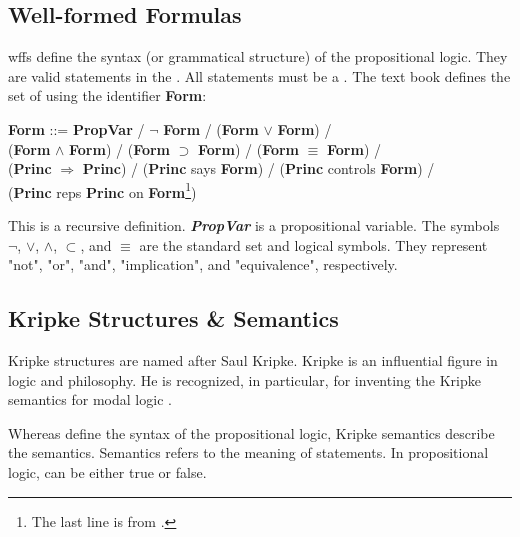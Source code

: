 \documentclass[../../main/main.tex]{subfiles}
\begin{document}
\subsection{Well-formed Formulas}\label{ssec:wff}
\Glspl{wff} define the syntax (or grammatical structure) of the propositional logic.  They are valid statements in the .  All  statements must be a .  The text book defines the set of  using the identifier \textbf{Form}:

\begin{center}\label{wffdef}
\textbf{Form} ::= \textbf{PropVar} / $\neg$ \textbf{Form} / (\textbf{Form} $\vee$ \textbf{Form}) / \\ 
	                  (\textbf{Form} $\wedge$ \textbf{Form}) / (\textbf{Form} $\supset$ \textbf{Form}) / (\textbf{Form} $\equiv$ \textbf{Form}) / \\
	                  (\textbf{Princ} $\Rightarrow$ \textbf{Princ}) / (\textbf{Princ} says \textbf{Form}) / (\textbf{Princ} controls \textbf{Form}) /\\
	                  (\textbf{Princ} reps \textbf{Princ} on \textbf{Form}\footnote{The last line is from \cite{certmanual}.})
\end{center}

This is a recursive definition.  \textbf{\textit{PropVar}} is a propositional variable.  The symbols $\neg$, $\vee$, $\wedge$, $\subset$, and $\equiv$ are the standard set and logical symbols.  They represent "not", "or", "and", "implication", and "equivalence", respectively.  

\subsection{Kripke Structures \& Semantics}\label{ssec:kripke}
Kripke structures are named after Saul Kripke.  Kripke is an influential figure in logic and philosophy.  He is recognized, in particular, for inventing the Kripke semantics for modal logic \cite{saulk}.    

Whereas  define the syntax of the propositional logic, Kripke semantics describe the semantics.  Semantics refers to the meaning of statements.  In propositional logic,  can be either true or false.  
\end{document}
